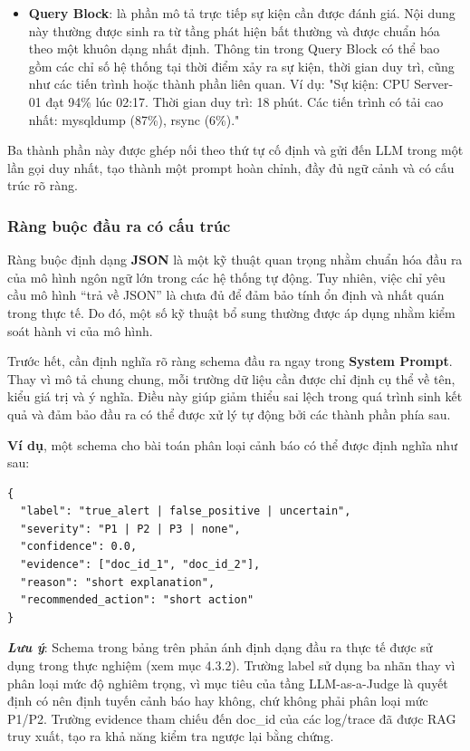 \begin{itemize}
\item \textbf{Query Block}: là phần mô tả trực tiếp sự kiện cần được đánh giá. Nội dung này thường được sinh ra từ tầng phát hiện bất thường và được chuẩn hóa theo một khuôn dạng nhất định. Thông tin trong Query Block có thể bao gồm các chỉ số hệ thống tại thời điểm xảy ra sự kiện, thời gian duy trì, cũng như các tiến trình hoặc thành phần liên quan.  Ví dụ: "Sự kiện: CPU Server-01 đạt 94\% lúc 02:17. Thời gian duy trì: 18 phút. Các tiến trình có tải cao nhất: mysqldump (87\%), rsync (6\%)."
\end{itemize}
Ba thành phần này được ghép nối theo thứ tự cố định và gửi đến LLM trong một lần gọi duy nhất, tạo thành một prompt hoàn chỉnh, đầy đủ ngữ cảnh và có cấu trúc rõ ràng.

\subsubsection*{Ràng buộc đầu ra có cấu trúc}
Ràng buộc định dạng \textbf{JSON} là một kỹ thuật quan trọng nhằm chuẩn hóa đầu ra của mô hình ngôn ngữ lớn trong các hệ thống tự động. Tuy nhiên, việc chỉ yêu cầu mô hình “trả về JSON” là chưa đủ để đảm bảo tính ổn định và nhất quán trong thực tế. Do đó, một số kỹ thuật bổ sung thường được áp dụng nhằm kiểm soát hành vi của mô hình.

Trước hết, cần định nghĩa rõ ràng schema đầu ra ngay trong \textbf{System Prompt}. Thay vì mô tả chung chung, mỗi trường dữ liệu cần được chỉ định cụ thể về tên, kiểu giá trị và ý nghĩa. Điều này giúp giảm thiểu sai lệch trong quá trình sinh kết quả và đảm bảo đầu ra có thể được xử lý tự động bởi các thành phần phía sau.

\textbf{Ví dụ}, một schema cho bài toán phân loại cảnh báo có thể được định nghĩa như sau:
\begin{table}[H]
\centering
\begin{tcolorbox}[
    colback=gray!5,       %
    colframe=blue!50!black, %
    arc=4mm,              %
    fonttitle=\small\bfseries,
    halign title=center,  %
    width=0.85\textwidth  %
]
\begin{lstlisting}[basicstyle=\small\ttfamily, columns=fullflexible, keepspaces=true]
{
  "label": "true_alert | false_positive | uncertain",
  "severity": "P1 | P2 | P3 | none",
  "confidence": 0.0,
  "evidence": ["doc_id_1", "doc_id_2"],
  "reason": "short explanation",
  "recommended_action": "short action"
}
\end{lstlisting}
\end{tcolorbox}
\caption{Định dạng cấu trúc đầu ra từ mô hình ngôn ngữ lớn}
\label{tab:llm_json_schema}
\end{table}
\textbf{\textit{Lưu ý}}: Schema trong bảng trên phản ánh định dạng đầu ra thực tế được sử dụng trong thực nghiệm (xem mục 4.3.2). Trường label sử dụng ba nhãn thay vì phân loại mức độ nghiêm trọng, vì mục tiêu của tầng LLM-as-a-Judge là quyết định có nên định tuyến cảnh báo hay không, chứ không phải phân loại mức P1/P2. Trường evidence tham chiếu đến doc\_id của các log/trace đã được RAG truy xuất, tạo ra khả năng kiểm tra ngược lại bằng chứng.

